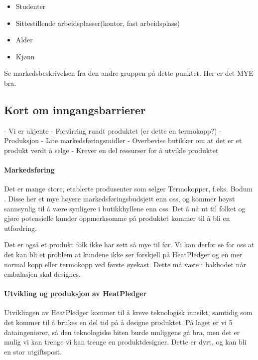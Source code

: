 \begin{itemize}
	\item Studenter
	\item Sittestillende arbeidsplasser(kontor, fast arbeidsplass)
	\item Alder
	\item Kjønn
\end{itemize}
Se markedsbeskrivelsen fra den andre gruppen på dette punktet. Her er det MYE bra.
\subsection{Kort om inngangsbarrierer}
- Vi er ukjente
- Forvirring rundt produktet (er dette en termokopp?)
- Produksjon
- Lite markedsføringsmidler
- Overbevise butikker om at det er et produkt verdt å selge
- Krever en del ressurser for å utvikle produktet
\paragraph{Markedsføring}
Det er mange store, etablerte produsenter som selger Termokopper, f.eks. Bodum \cite{bodum}. Disse her et mye høyere markedsføringsbudsjett enn oss, og kommer høyst sannsynlig til å være synligere i butikkhyllene enn oss. Det å nå ut til folket og gjøre potensielle kunder oppmerksomme på produktet kommer til å bli en utfordring.

Det er også et produkt folk ikke har sett så mye til før. Vi kan derfor se for oss at det kan bli et problem at kundene ikke ser forskjell på HeatPledger og en mer normal kopp eller termokopp ved første øyekast. Dette må være i bakhodet når embalasjen skal designes.

\paragraph{Utvikling og produksjon av HeatPledger}
Utviklingen av HeatPledger kommer til å kreve teknologisk innsikt, samtidig som det kommer til å brukes en del tid på å designe produktet. På laget er vi 5 dataingeniører, så den teknologiske biten burde muliggens gå bra, men det er mulig vi kan trenge vi kan trenge en produktdesigner. Dette er dyrt, og kan bli en stor utgiftspost.

